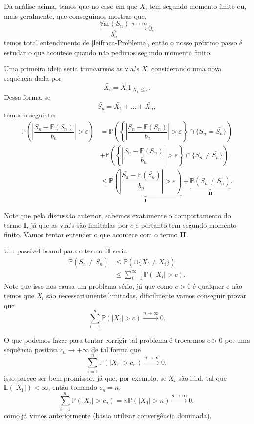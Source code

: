 \documentclass[12pt,a4paper,oneside]{book}
\theoremstyle{definition}
\theoremstyle{remark}
\numberwithin{equation}{section}
\newcommand{\e}{\varepsilon}
\newcommand{\E}{\mathbb{E}}
\newcommand{\pr}{\mathbb{P}}
\newcommand{\Var}{\mathbb{V}\text{ar}}
\newcommand{\rarrowlimn}{\xrightarrow{n\rightarrow \infty}}
\begin{document}
Da análise acima, temos que no caso em que $X_i$ tem segundo momento finito ou, mais geralmente, que conseguimos mostrar que, 
$$ \dfrac{\Var(S_n)}{b_n^2}  \xrightarrow{n\rightarrow \infty}0,$$
temos total entendimento de \ref{leifraca-Problema}, então o nosso próximo passo é estudar o que acontece quando não pedimos segundo momento finito. 

Uma primeira ideia seria truncarmos as v.a.'s $X_i$ considerando uma nova sequência dada por
$$ \bar{X_i} = X_i1_{|X_i|\leq c}. $$
Dessa forma, se 
$$\bar{S_n} = \bar{X_1} + \dots +\bar{X_n} ,$$
temos o seguinte:
\begin{align*}
\pr\left(\left|\dfrac{S_n-\E(S_n)}{b_n}\right|>\e \right)  &= \pr\left( \left\lbrace   \left|\dfrac{S_n-\E(S_n)}{b_n}\right|>\e \right\rbrace\cap \{ S_n = \bar{S_n}\} \right) \\&+\pr\left( \left\lbrace   \left|\dfrac{S_n-\E(S_n)}{b_n}\right|>\e \right\rbrace\cap \{ S_n \neq \bar{S_n}\} \right) \\
& \leq  \underbrace{\pr\left(   \left|\dfrac{\bar{S_n}-\E(\bar{S_n})}{b_n}\right|>\e  \right)}_{\textbf{I}} + \underbrace{\pr(S_n \neq \bar{S_n}) }_{\textbf{II}}.
\end{align*}

Note que pela discussão anterior, sabemos exatamente o comportamento do termo \textbf{I}, já que as v.a.'s são limitadas por $c$ e portanto tem  segundo momento finito. Vamos tentar entender o que acontece com o termo \textbf{II}. 

Um possível bound para o termo \textbf{II} seria
\begin{align*}
\pr(S_n \neq \bar{S_n})&\leq \pr(\cup \{X_i\neq \bar{X_i}\})\\
&\leq \sum_{i=1}^\infty \pr(|X_i|>c).
\end{align*}
Note que isso nos causa um problema sério, já que como $c>0$ é qualquer e não temos que $X_i$ são necessariamente limitadas, dificilmente vamos conseguir provar que 
$$\sum_{i=1}^n \pr(|X_i|>c) \rarrowlimn 0. $$

O que podemos fazer para tentar corrigir tal problema é trocarmos $c>0$ por uma sequência positiva $c_n \rightarrow +\infty$ de tal forma que
$$\sum_{i=1}^n \pr(|X_i|>c_n) \rarrowlimn 0,$$
isso parece ser bem promissor, já que, por exemplo, se $X_i$ são i.i.d. tal que $\E(|X_1|)<\infty$, então tomando $c_n = n,$
$$\sum_{i=1}^n \pr(|X_i|>c_n) =  n\pr(|X_1|>n) \rarrowlimn 0,$$
como já vimos anteriormente (basta utilizar convergência dominada). 
\end{document}
